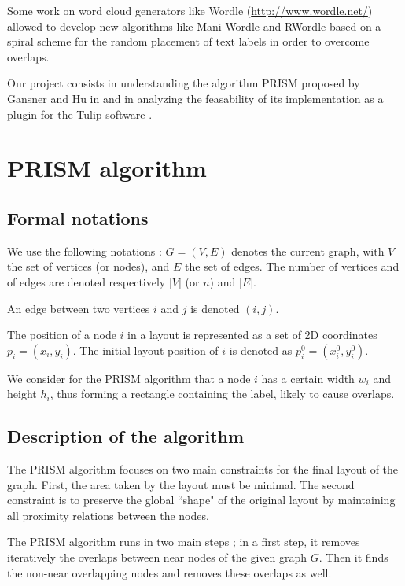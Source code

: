\documentclass[12pt]{report}
\begin{document}
Some work on word cloud generators like Wordle (\url{http://www.wordle.net/}) allowed to develop new algorithms like Mani-Wordle \cite{Koh10} and RWordle \cite{SSSK12} based on a spiral scheme for the random placement of text labels in order to overcome overlaps.


\bigskip
Our project consists in understanding the algorithm PRISM proposed by Gansner and Hu in \cite{Gansner08} and in analyzing the feasability of its implementation as a plugin for the Tulip software \cite{Auber12}.



\chapter{PRISM algorithm}

\section{Formal notations}

We use the following notations : $G = (V,E)$ denotes the current graph, with $V$ the set of vertices (or nodes), and $E$ the set of edges. The number of vertices and of edges are denoted respectively $|V|$ (or $n$) and $|E|$.

An edge between two vertices $i$ and $j$ is denoted $(i,j)$.

The position of a node $i$ in a layout is represented as a set of 2D coordinates $p_i = (x_i, y_i)$. The initial layout position of $i$ is denoted as $p_i^0 = (x_i^0, y_i^0)$.

We consider for the PRISM algorithm that a node $i$ has a certain width $w_i$ and height $h_i$, thus forming a rectangle containing the label, likely to cause overlaps.

\section{Description of the algorithm}

The PRISM algorithm focuses on two main constraints for the final layout of the graph. First, the area taken by the layout must be minimal. The second constraint is to preserve the global ``shape" of the original layout by maintaining all proximity relations between the nodes.

The PRISM algorithm runs in two main steps ; in a first step, it removes iteratively the overlaps between near nodes of the given graph $G$. Then it finds the non-near overlapping nodes and removes these overlaps as well.
\end{document}
